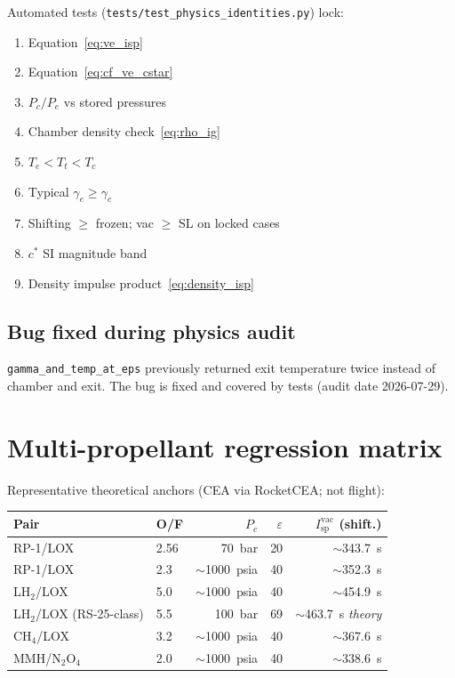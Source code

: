 \documentclass[11pt,a4paper]{report}
\newcommand{\Isp}{I_{\mathrm{sp}}}
\newcommand{\cstar}{c^{*}}
\newcommand{\Pc}{P_{c}}
\newcommand{\Pe}{P_{e}}
\newcommand{\eps}{\varepsilon}
\begin{document}
Automated tests (\texttt{tests/test\_physics\_identities.py}) lock:

\begin{enumerate}[leftmargin=*]
  \item Equation~\eqref{eq:ve_isp}
  \item Equation~\eqref{eq:cf_ve_cstar}
  \item $\Pc/\Pe$ vs stored pressures
  \item Chamber density check~\eqref{eq:rho_ig}
  \item $T_e < T_t < T_c$
  \item Typical $\gamma_e \ge \gamma_c$
  \item Shifting $\ge$ frozen; vac $\ge$ SL on locked cases
  \item $\cstar$ SI magnitude band
  \item Density impulse product~\eqref{eq:density_isp}
\end{enumerate}

\subsection{Bug fixed during physics audit}

\texttt{gamma\_and\_temp\_at\_eps} previously returned exit temperature twice
instead of chamber and exit. The bug is fixed and covered by tests (audit date
2026-07-29).

\section{Multi-propellant regression matrix}

Representative theoretical anchors (CEA via RocketCEA; not flight):

\begin{center}
\footnotesize
\begin{tabular}{@{}llrrr@{}}
\toprule
Pair & O/F & $\Pc$ & $\eps$ & $\Isp^{\mathrm{vac}}$ (shift.) \\
\midrule
RP-1/LOX & 2.56 & 70~bar & 20 & $\sim$343.7~s \\
RP-1/LOX & 2.3 & $\sim$1000~psia & 40 & $\sim$352.3~s \\
LH$_2$/LOX & 5.0 & $\sim$1000~psia & 40 & $\sim$454.9~s \\
LH$_2$/LOX (RS-25-class) & 5.5 & 100~bar & 69 & $\sim$463.7~s \emph{theory} \\
CH$_4$/LOX & 3.2 & $\sim$1000~psia & 40 & $\sim$367.6~s \\
MMH/N$_2$O$_4$ & 2.0 & $\sim$1000~psia & 40 & $\sim$338.6~s \\
\bottomrule
\end{tabular}
\end{center}
\end{document}
